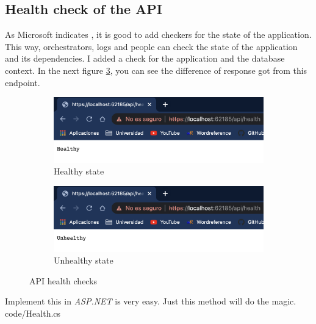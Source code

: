     \subsection{Health check of the API}
        As Microsoft indicates \cite{Health}, it is good to add checkers for the state of the application. 
        This way, orchestrators, logs and people can check the state of the application and its dependencies.
        I added a check for the application and the database context. 
        In the next figure \ref{fig:impl_health}, you can see the difference of response got from this endpoint.
        
        \begin{figure}[H]
            \centering
            \begin{subfigure}[T]{0.49\textwidth}
                \centering
                \includegraphics[width=\textwidth]{assets/healthy.png}
                \caption{Healthy state}
                \label{fig:impl_healthy}
            \end{subfigure}
            \hfill
            \begin{subfigure}[T]{0.49\textwidth}
                \centering
                \includegraphics[width=\textwidth]{assets/unhealthy.png}
                \caption{Unhealthy state}
                \label{fig:impl_unhealthy}
            \end{subfigure}
            \caption{API health checks}
            \label{fig:impl_health}
        \end{figure}

        Implement this in \textit{ASP.NET} is very easy. Just this method will do the magic. \\
        
        {code/Health.cs}

